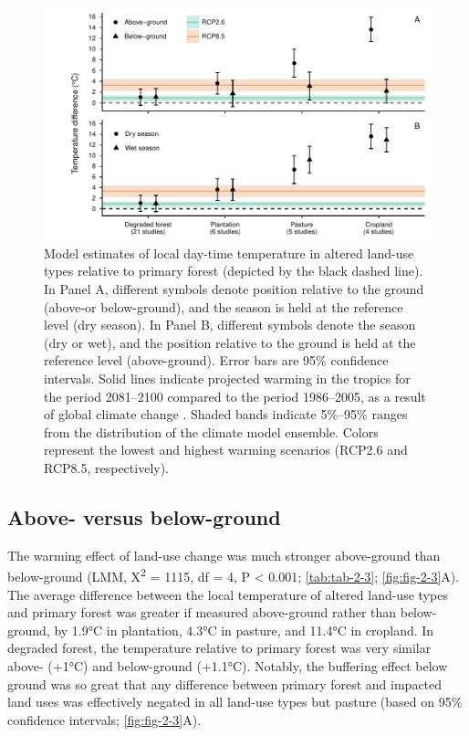 \documentclass[12pt,a4paper,]{report}
\theoremstyle{definition}
\theoremstyle{definition}
\theoremstyle{definition}
\theoremstyle{remark}
\begin{document}
\begin{figure}
\centering
\includegraphics{figs/fig2.3.pdf}
\caption{\label{fig:fig-2-3}Model estimates of local day-time temperature in altered land-use types relative to primary forest (depicted by the black dashed line). In Panel A, different symbols denote position relative to the ground (above-or below-ground), and the season is held at the reference level (dry season). In Panel B, different symbols denote the season (dry or wet), and the position relative to the ground is held at the reference level (above-ground). Error bars are 95\% confidence intervals. Solid lines indicate projected warming in the tropics for the period 2081–2100 compared to the period 1986–2005, as a result of global climate change \citep{ipcc2013}. Shaded bands indicate 5\%–95\% ranges from the distribution of the climate model ensemble. Colors represent the lowest and highest warming scenarios (RCP2.6 and RCP8.5, respectively).}
\end{figure}

\subsection{Above- versus
below-ground}\label{above--versus-below-ground}

The warming effect of land-use change was much stronger above-ground
than below-ground (LMM, Χ\textsuperscript{2} = 1115, df = 4, P
\textless{} 0.001; \autoref{tab:tab-2-3}; \autoref{fig:fig-2-3}A). The
average difference between the local temperature of altered land-use
types and primary forest was greater if measured above-ground rather
than below-ground, by 1.9°C in plantation, 4.3°C in pasture, and 11.4°C
in cropland. In degraded forest, the temperature relative to primary
forest was very similar above- (+1°C) and below-ground (+1.1°C).
Notably, the buffering effect below ground was so great that any
difference between primary forest and impacted land uses was effectively
negated in all land-use types but pasture (based on 95\% confidence
intervals; \autoref{fig:fig-2-3}A).
\end{document}
